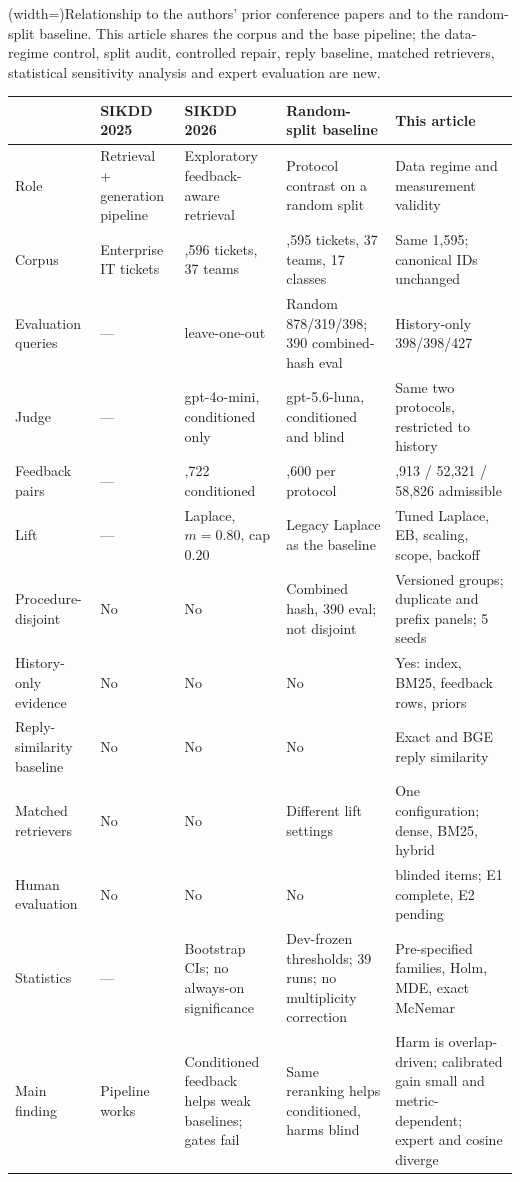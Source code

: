 \Table[!btp](width=\textwidth){Relationship to the authors' prior conference
papers and to the random-split baseline. This article shares the
corpus and the base pipeline; the data-regime control, split audit, controlled
repair, reply baseline, matched retrievers, statistical sensitivity analysis and
expert evaluation are new.\label{tab:prior}}{
\scriptsize
\begin{tabularx}{\textwidth}{@{}p{}>{\raggedright\arraybackslash}X>{\raggedright\arraybackslash}X>{\raggedright\arraybackslash}X>{\raggedright\arraybackslash}X@{}}
\toprule
 & SIKDD 2025 & SIKDD 2026 & Random-split baseline & This article \\
\midrule
Role & Retrieval + generation pipeline & Exploratory feedback-aware retrieval & Protocol contrast on a random split & Data regime and measurement validity \\
Corpus & Enterprise IT tickets & 1,596 tickets, 37 teams & 1,595 tickets, 37 teams, 17 classes & Same 1,595; canonical IDs unchanged \\
Evaluation queries & --- & 250 leave-one-out & Random 878/319/398; 390 combined-hash eval & History-only 398/398/427 \\
Judge & --- & gpt-4o-mini, conditioned only & gpt-5.6-luna, conditioned and blind & Same two protocols, restricted to history \\
Feedback pairs & --- & 102,722 conditioned & 175,600 per protocol & 94,913 / 52,321 / 58,826 admissible \\
Lift & --- & Laplace, $m=0.80$, cap $0.20$ & Legacy Laplace as the baseline & Tuned Laplace, EB, scaling, scope, backoff \\
Procedure-disjoint & No & No & Combined hash, 390 eval; not disjoint & Versioned groups; duplicate and prefix panels; 5 seeds \\
History-only evidence & No & No & No & Yes: index, BM25, feedback rows, priors \\
Reply-similarity baseline & No & No & No & Exact and BGE reply similarity \\
Matched retrievers & No & No & Different lift settings & One configuration; dense, BM25, hybrid \\
Human evaluation & No & No & No & 105 blinded items; E1 complete, E2 pending \\
Statistics & --- & Bootstrap CIs; no always-on significance & Dev-frozen thresholds; 39 runs; no multiplicity correction & Pre-specified families, Holm, MDE, exact McNemar \\
Main finding & Pipeline works & Conditioned feedback helps weak baselines; gates fail & Same reranking helps conditioned, harms blind & Harm is overlap-driven; calibrated gain small and metric-dependent; expert and cosine diverge \\
\bottomrule
\end{tabularx}}

